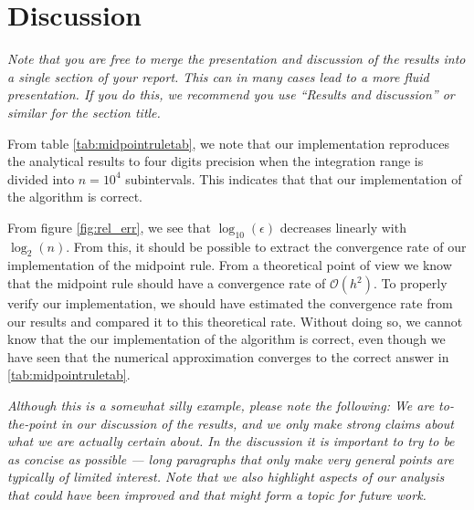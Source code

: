 \documentclass[english,notitlepage,reprint,nofootinbib]{revtex4-1}  %
\begin{document}


\section{Discussion}\label{sec:discussion}
%
\textit{Note that you are free to merge the presentation and discussion of the results into a single section of your report. This can in many cases lead to a more fluid presentation. If you do this, we recommend you use ``Results and discussion'' or similar for the section title.}

From table \ref{tab:midpointruletab}, we note that our implementation reproduces the analytical results to four digits precision when the integration range is divided into $n = 10^4$ subintervals. This indicates that that our implementation of the algorithm is correct.

From figure \ref{fig:rel_err}, we see that $\log_{10}(\epsilon)$ decreases linearly with $\log_{2}(n)$. From this, it should be possible to extract the convergence rate of our implementation of the midpoint rule. From a theoretical point of view we know that the midpoint rule should have a convergence rate of $\mathcal{O}(h^2)$. To properly verify our implementation, we should have estimated the convergence rate from our results and compared it to this theoretical rate. Without doing so, we cannot know that the our implementation of the algorithm is correct, even though we have seen that the numerical approximation converges to the correct answer in \ref{tab:midpointruletab}.

\textit{Although this is a somewhat silly example, please note the following: We are to-the-point in our discussion of the results, and we only make strong claims about what we are actually certain about. In the discussion it is important to try to be as concise as possible --- long paragraphs that only make very general points are typically of limited interest. Note that we also highlight aspects of our analysis that could have been improved and that might form a topic for future work.}
\end{document}
